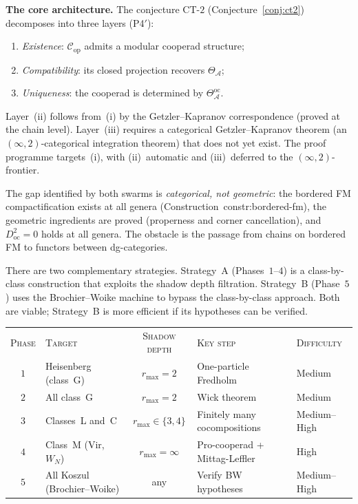 \documentclass[11pt]{article}
\newcommand{\cA}{\mathcal{A}}
\newcommand{\cC}{\mathcal{C}}
\begin{document}
\medskip\noindent
\textbf{The core architecture.}
The conjecture CT-$2$ (Conjecture~\ref{conj:ct2}) decomposes into
three layers (P4$'$):
\begin{enumerate}[label=\textup{(\roman*)},nosep]
\item \emph{Existence}: $\cC_{\mathrm{op}}$ admits a modular
  cooperad structure;
\item \emph{Compatibility}: its closed projection recovers
  $\Theta_\cA$;
\item \emph{Uniqueness}: the cooperad is determined by
  $\Theta^{\mathrm{oc}}_\cA$.
\end{enumerate}
Layer~(ii) follows from~(i) by the Getzler--Kapranov
correspondence (proved at the chain level).
Layer~(iii) requires a categorical Getzler--Kapranov
theorem (an $(\infty,2)$-categorical integration theorem)
that does not yet exist.  The proof programme
targets~(i), with (ii)~automatic and (iii)~deferred
to the $(\infty,2)$-frontier.

The gap identified by both swarms is \emph{categorical,
not geometric}: the bordered FM compactification exists
at all genera (Construction~\textup{constr:bordered-fm}),
the geometric ingredients are proved (properness
and corner cancellation), and $D^2_{\mathrm{oc}} = 0$ holds
at all genera.  The obstacle is the passage from chains
on bordered FM to functors between dg-categories.

There are two complementary strategies.  Strategy~A
(Phases~$1$--$4$) is a class-by-class construction that
exploits the shadow depth filtration.  Strategy~B
(Phase~$5$) uses the Brochier--Woike machine to bypass
the class-by-class approach.  Both are viable;
Strategy~B is more efficient if its hypotheses can be
verified.

\begin{center}
\renewcommand{\arraystretch}{1.3}
\begin{tabular}{@{}clcll@{}}
\textsc{Phase} & \textsc{Target}
  & \textsc{Shadow depth}
  & \textsc{Key step}
  & \textsc{Difficulty} \\[3pt]
$1$ & Heisenberg (class~G)
  & $r_{\max} = 2$
  & One-particle Fredholm
  & Medium \\
$2$ & All class~G
  & $r_{\max} = 2$
  & Wick theorem
  & Medium \\
$3$ & Classes~L and~C
  & $r_{\max} \in \{3,4\}$
  & Finitely many cocompositions
  & Medium--High \\
$4$ & Class~M (Vir, $W_N$)
  & $r_{\max} = \infty$
  & Pro-cooperad + Mittag-Leffler
  & High \\
$5$ & All Koszul (Brochier--Woike)
  & any
  & Verify BW hypotheses
  & Medium--High
\end{tabular}
\end{center}
\end{document}
